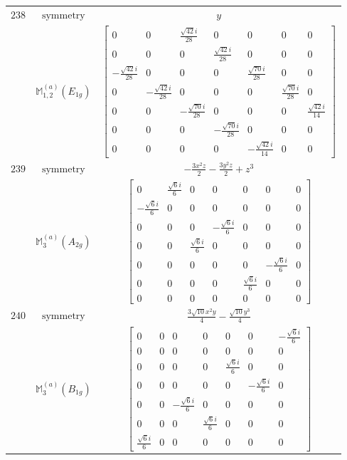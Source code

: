 \documentclass[fleqn,8pt,landscape]{jsarticle}
\begin{document}
\begin{longtable}{ccc}
$ 238 $ & $ \text{symmetry} $ & $ y $ \\
$  $ & $ \mathbb{M}_{1,2}^{(a)}(E_{1g}) $ & $ \begin{bmatrix} 0 & 0 & \frac{\sqrt{42} i}{28} & 0 & 0 & 0 & 0 \\ 0 & 0 & 0 & \frac{\sqrt{42} i}{28} & 0 & 0 & 0 \\ - \frac{\sqrt{42} i}{28} & 0 & 0 & 0 & \frac{\sqrt{70} i}{28} & 0 & 0 \\ 0 & - \frac{\sqrt{42} i}{28} & 0 & 0 & 0 & \frac{\sqrt{70} i}{28} & 0 \\ 0 & 0 & - \frac{\sqrt{70} i}{28} & 0 & 0 & 0 & \frac{\sqrt{42} i}{14} \\ 0 & 0 & 0 & - \frac{\sqrt{70} i}{28} & 0 & 0 & 0 \\ 0 & 0 & 0 & 0 & - \frac{\sqrt{42} i}{14} & 0 & 0 \end{bmatrix} $ \\ \hline
$ 239 $ & $ \text{symmetry} $ & $ - \frac{3 x^{2} z}{2} - \frac{3 y^{2} z}{2} + z^{3} $ \\
$  $ & $ \mathbb{M}_{3}^{(a)}(A_{2g}) $ & $ \begin{bmatrix} 0 & \frac{\sqrt{6} i}{6} & 0 & 0 & 0 & 0 & 0 \\ - \frac{\sqrt{6} i}{6} & 0 & 0 & 0 & 0 & 0 & 0 \\ 0 & 0 & 0 & - \frac{\sqrt{6} i}{6} & 0 & 0 & 0 \\ 0 & 0 & \frac{\sqrt{6} i}{6} & 0 & 0 & 0 & 0 \\ 0 & 0 & 0 & 0 & 0 & - \frac{\sqrt{6} i}{6} & 0 \\ 0 & 0 & 0 & 0 & \frac{\sqrt{6} i}{6} & 0 & 0 \\ 0 & 0 & 0 & 0 & 0 & 0 & 0 \end{bmatrix} $ \\ \hline
$ 240 $ & $ \text{symmetry} $ & $ \frac{3 \sqrt{10} x^{2} y}{4} - \frac{\sqrt{10} y^{3}}{4} $ \\
$  $ & $ \mathbb{M}_{3}^{(a)}(B_{1g}) $ & $ \begin{bmatrix} 0 & 0 & 0 & 0 & 0 & 0 & - \frac{\sqrt{6} i}{6} \\ 0 & 0 & 0 & 0 & 0 & 0 & 0 \\ 0 & 0 & 0 & 0 & \frac{\sqrt{6} i}{6} & 0 & 0 \\ 0 & 0 & 0 & 0 & 0 & - \frac{\sqrt{6} i}{6} & 0 \\ 0 & 0 & - \frac{\sqrt{6} i}{6} & 0 & 0 & 0 & 0 \\ 0 & 0 & 0 & \frac{\sqrt{6} i}{6} & 0 & 0 & 0 \\ \frac{\sqrt{6} i}{6} & 0 & 0 & 0 & 0 & 0 & 0 \end{bmatrix} $ \\ \hline

\end{longtable}
\end{document}
